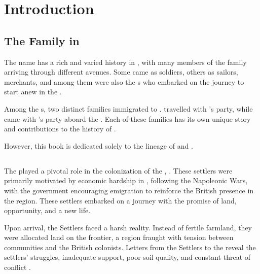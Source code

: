\chapter{Introduction}
\label{introduction}

\section[The McDonald Family in South Africa]{The \mcdonald{} Family in \southAfrica}
\label{introduction: overview}

The \mcdonald{} name has a rich and varied history in \southAfrica{}, with many members of the \mcdonald{} family arriving through different avenues. Some came as soldiers, others as sailors, merchants, and among them were also the \settler s who embarked on the journey to start anew in the \capeColony{}.

Among the \settler s, two distinct \mcdonald{} families immigrated to \southAfrica{}. \mcdonaldPName{} travelled with \synnotWName{}'s party, while \mcdonaldJName{} came with \biggarAName’s party aboard the \weymouth{}. Each of these families has its own unique story and contributions to the history of \southAfrica{}.

However, this book is dedicated solely to the lineage of \mcdonaldJName{} and \welchMName{}.

\section[British 1820 Settlers]{\settlersBritish{}}
\label{introduction: settlers}

The \settlersBritish{} played a pivotal role in the colonization of the \easternCape{}, \southAfrica{}. These settlers were primarily motivated by economic hardship in \britain{}, following the Napoleonic Wars, with the government encouraging emigration to reinforce the British presence in the region. These settlers embarked on a journey with the promise of land, opportunity, and a new life.

Upon arrival, the Settlers faced a harsh reality. Instead of fertile farmland, they were allocated land on the \easternCape{} frontier, a region fraught with tension between \xhosa{} communities and the British colonists. Letters from the Settlers to the \colonialOffice{} reveal the settlers' struggles, inadequate support, poor soil quality, and constant threat of conflict \autocite{eggsa:settlerStatement}.

